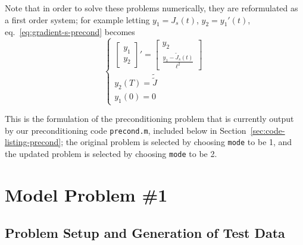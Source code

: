 \documentclass[letterpaper, 10pt, draft]{amsart}
\theoremstyle{definition}
\theoremstyle{remark}
\begin{document}
Note that in order to solve these problems numerically, they are reformulated as
a first order system; for example letting $y_1 = J_s(t)$, $y_2 = y_1'(t)$,
eq.~\eqref{eq:gradient-s-precond} becomes
\begin{equation}
  \begin{cases}
    \begin{bmatrix}
      y_1
      \\
      y_2
    \end{bmatrix}'
    = \begin{bmatrix}
      y_2
      \\
      \frac{y_1 - \tilde{J}_s(t)}{\ell^2}
    \end{bmatrix}
    \\
    y_2(T) = \tilde{\tilde{J}}
    \\
    y_1(0) = 0
  \end{cases}
\end{equation}

This is the formulation of the preconditioning problem that is currently output
by our preconditioning code \verb+precond.m+, included below in
Section~\ref{sec:code-listing-precond}; the original problem is selected by
choosing \verb+mode+ to be 1, and the updated problem is selected by choosing
\verb+mode+ to be 2.

\section{Model Problem \#1}\label{sec:model-problem-1}

\subsection{Problem Setup and Generation of Test Data}
\end{document}
